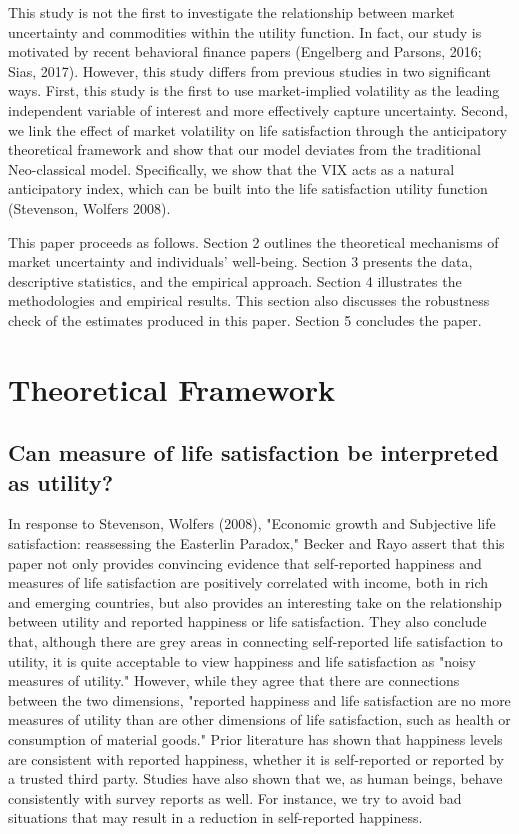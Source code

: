 \documentclass[11pt,a4paper,oldfontcommands]{memoir}
\begin{document}
{This study is not the first to investigate the relationship between market uncertainty and commodities within the utility function. In fact, our study is motivated by recent behavioral finance papers (Engelberg and Parsons, 2016; Sias, 2017). However, this study differs from previous studies in two significant ways. First, this study is the first to use market-implied volatility as the leading independent variable of interest and more effectively capture uncertainty. Second, we link the effect of market volatility on life satisfaction through the anticipatory theoretical framework and show that our model deviates from the traditional Neo-classical model. Specifically, we show that the VIX acts as a natural anticipatory index, which can be built into the life satisfaction utility function (Stevenson, Wolfers 2008).

This paper proceeds as follows. Section 2 outlines the theoretical mechanisms of market uncertainty and individuals' well-being. Section 3 presents the data, descriptive statistics, and the empirical approach. Section 4 illustrates the methodologies and empirical results. This section also discusses the robustness check of the estimates produced in this paper. Section 5 concludes the paper.

\section{Theoretical Framework}

\subsection{Can measure of life satisfaction be interpreted as utility?}

In response to Stevenson, Wolfers (2008), "Economic growth and Subjective life satisfaction: reassessing the Easterlin Paradox," Becker and Rayo assert that this paper not only provides convincing evidence that self-reported happiness and measures of life satisfaction are positively correlated with income, both in rich and emerging countries, but also provides an interesting take on the relationship between utility and reported happiness or life satisfaction. They also conclude that, although there are grey areas in connecting self-reported life satisfaction to utility, it is quite acceptable to view happiness and life satisfaction as "noisy measures of utility." However, while they agree that there are connections between the two dimensions, "reported happiness and life satisfaction are no more measures of utility than are other dimensions of life satisfaction, such as health or consumption of material goods." Prior literature has shown that happiness levels are consistent with reported happiness, whether it is self-reported or reported by a trusted third party. Studies have also shown that we, as human beings, behave consistently with survey reports as well. For instance, we try to avoid bad situations that may result in a reduction in self-reported happiness.

}
\end{document}
